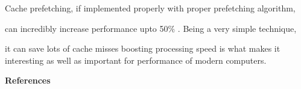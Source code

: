 \documentclass[12pt]{article}
\begin{document}
\vspace{\baselineskip}
{\fontsize{15pt}{18.0pt}\selectfont \textcolor[HTML]{222222}{Cache prefetching, if implemented properly with proper prefetching algorithm,}\par}\par

{\fontsize{15pt}{18.0pt}\selectfont \textcolor[HTML]{222222}{can incredibly increase performance upto 50$\%$ . Being a very simple technique, }\par}\par

{\fontsize{15pt}{18.0pt}\selectfont \textcolor[HTML]{222222}{it can save lots of cache misses boosting processing speed is what makes it interesting as well as important for performance of modern computers.}\par}\par


\vspace{\baselineskip}
{\fontsize{20pt}{24.0pt}\selectfont \textbf{\textcolor[HTML]{222222}{References}}\par}\par
\end{document}
